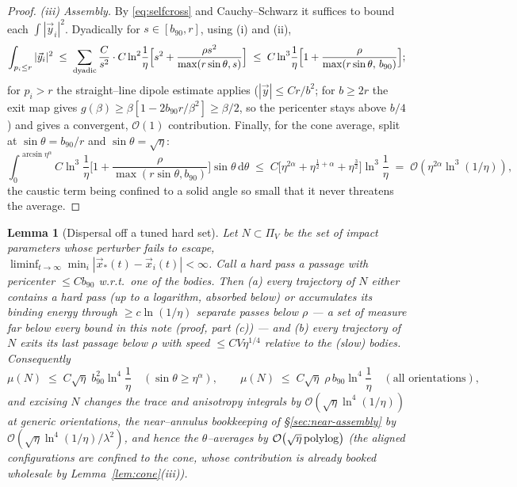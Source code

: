 \documentclass[11pt]{article}
\newcommand{\dd}{\mathrm{d}}
\newcommand{\order}[1]{\mathcal O\!\left(#1\right)}
\newtheorem{lemma}{Lemma}
\begin{document}
\begin{proof}
\emph{(iii) Assembly.} By \eqref{eq:selfcross} and Cauchy--Schwarz it suffices to bound each
$\int|\vec y_i|^2$. Dyadically for $s\in[b_{90},r]$, using (i) and (ii),
\begin{equation*}
  \int_{p_i\le r}|\vec y_i|^2
  \;\le\;\sum_{\rm dyadic}\frac{C}{s^2}\cdot C\ln^2\!\frac1\eta
  \Big[s^2+\frac{\rho s^2}{\max(r\sin\theta,s)}\Big]
  \;\le\;C\ln^3\!\frac1\eta\Big[1+\frac{\rho}{\max(r\sin\theta,\,b_{90})}\Big];
\end{equation*}
for $p_i>r$ the straight--line dipole estimate applies ($|\vec y|\le Cr/b^2$; for $b\ge 2r$ the
exit map gives $g(\beta)\ge\beta[1-2b_{90}r/\beta^2]\ge\beta/2$, so the pericenter stays above
$b/4$) and gives a convergent, $\order1$ contribution. Finally, for the cone average, split at
$\sin\theta=b_{90}/r$ and $\sin\theta=\sqrt\eta$:
\begin{equation*}
  \int_0^{\arcsin\eta^\alpha}\!\!C\ln^3\!\frac1\eta
  \Big[1+\frac{\rho}{\max(r\sin\theta,b_{90})}\Big]\sin\theta\,\dd\theta
  \;\le\;C\big[\eta^{2\alpha}+\eta^{\frac12+\alpha}+\eta^{\frac32}\big]\ln^3\!\frac1\eta
  \;=\;\order{\eta^{2\alpha}\ln^3(1/\eta)} ,
\end{equation*}
the caustic term being confined to a solid angle so small that it never threatens the average.
\end{proof}

\begin{lemma}[Dispersal off a tuned hard set]
\label{lem:nondisp}
Let $N\subset\Pi_V$ be the set of impact parameters whose perturber fails to escape,
$\liminf_{t\to\infty}\min_i|\vec x_*(t)-\vec x_i(t)|<\infty$. Call a \emph{hard pass} a passage
with pericenter $\le Cb_{90}$ w.r.t.\ one of the bodies. Then (a) every trajectory of $N$ either
contains a hard pass (up to a logarithm, absorbed below) or accumulates its binding energy through
$\ge c\ln(1/\eta)$ separate passes below $\rho$ --- a set of measure far below every bound in this
note (proof, part (c)) --- and (b) every trajectory of $N$ exits its last passage below $\rho$
with speed $\le CV\eta^{1/4}$ relative to the (slow) bodies. Consequently
\begin{equation}
  \mu(N)\;\le\;C\sqrt\eta\;b_{90}^2\ln^4\!\frac1\eta\quad(\sin\theta\ge\eta^\alpha),\qquad
  \mu(N)\;\le\;C\sqrt\eta\;\rho\,b_{90}\ln^4\!\frac1\eta\quad(\text{all orientations}),
  \label{eq:Nmeasure}
\end{equation}
and excising $N$ changes the trace and anisotropy integrals by $\order{\sqrt\eta\ln^4(1/\eta)}$ at
generic orientations, the near--annulus bookkeeping of \S\ref{sec:near-assembly} by
$\order{\sqrt\eta\ln^4(1/\eta)/\lambda^2}$, and hence the $\theta$--averages by
$\order{\sqrt\eta\,{\rm polylog}}$ (the aligned configurations are confined to the cone, whose
contribution is already booked wholesale by Lemma~\ref{lem:cone}(iii)).
\end{lemma}
\end{document}
